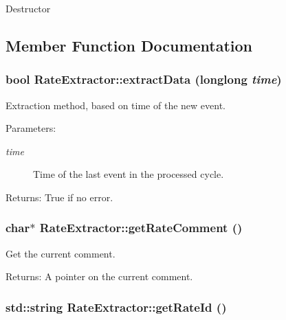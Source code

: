 Destructor 

\subsection{Member Function Documentation}
\subsubsection{\setlength{\rightskip}{0pt plus 5cm}bool Rate\-Extractor::extract\-Data (longlong {\em time})}\label{classRateExtractor_a5}


Extraction method, based on time of the new event.

\begin{Desc}
\item[Parameters:]
\begin{description}
\item[{\em time}]Time of the last event in the processed cycle.\end{description}
\end{Desc}
\begin{Desc}
\item[Returns:]True if no error. \end{Desc}
\subsubsection{\setlength{\rightskip}{0pt plus 5cm}char$\ast$ Rate\-Extractor::get\-Rate\-Comment ()\hspace{0.3cm}{\tt  [inline]}}\label{classRateExtractor_a3}


Get the current comment. \begin{Desc}
\item[Returns:]A pointer on the current comment. \end{Desc}
\subsubsection{\setlength{\rightskip}{0pt plus 5cm}std::string Rate\-Extractor::get\-Rate\-Id ()\hspace{0.3cm}{\tt  [inline]}}\label{classRateExtractor_a4}


